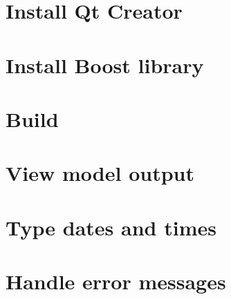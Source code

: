 \documentclass [a4paper, 11pt, openany]  {memoir}
\begin{document}
\chapter{Install Qt Creator}

\chapter{Install Boost library}

\chapter{Build \protect\US}

\chapter{View model output}

\chapter{Type dates and times}

\chapter{Handle error messages}




\end{document}
